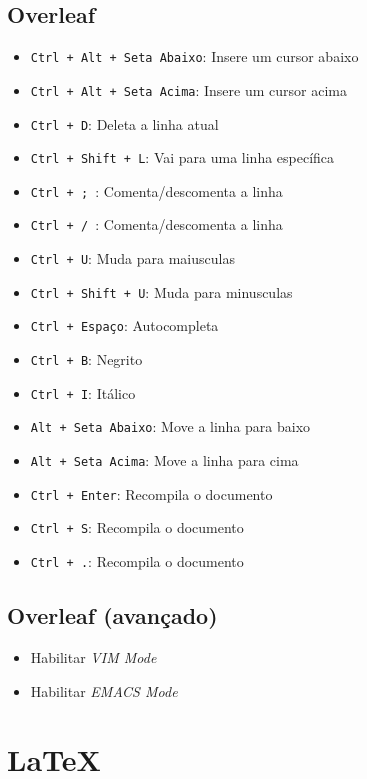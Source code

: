 \documentclass[a4paper, 12pt]{article}
\begin{document}
\subsection{Overleaf}\label{overleaf}

\begin{itemize}
	\item \texttt{Ctrl + Alt + Seta Abaixo}: Insere um cursor abaixo
	\item \texttt{Ctrl + Alt + Seta Acima}: Insere um cursor acima
	\item \texttt{Ctrl + D}: Deleta a linha atual
	\item \texttt{Ctrl + Shift + L}: Vai para uma linha específica
	\item \texttt{Ctrl + ; }: Comenta/descomenta a linha
	\item \texttt{Ctrl + / }: Comenta/descomenta a linha
	\item \texttt{Ctrl + U}: Muda para maiusculas
	\item \texttt{Ctrl + Shift + U}: Muda para minusculas
	\item \texttt{Ctrl + Espaço}: Autocompleta
	\item \texttt{Ctrl + B}: Negrito
	\item \texttt{Ctrl + I}: Itálico
	\item \texttt{Alt + Seta Abaixo}: Move a linha para baixo
	\item \texttt{Alt + Seta Acima}: Move a linha para cima
	\item \texttt{Ctrl + Enter}: Recompila o documento
	\item \texttt{Ctrl + S}: Recompila o documento
	\item \texttt{Ctrl + .}: Recompila o documento
\end{itemize}

\subsection{Overleaf (avançado)}

\begin{itemize}
    \item Habilitar \textit{VIM Mode}
    \item Habilitar \textit{EMACS Mode}
\end{itemize}

\section{\LaTeX}\label{latex}
\end{document}
